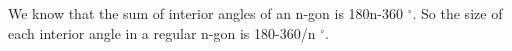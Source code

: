 We know that the sum of interior angles of an n-gon is
180n-360 $^{\circ}$. So the size of each interior angle in a
regular n-gon is 180-360/n $^{\circ}$.